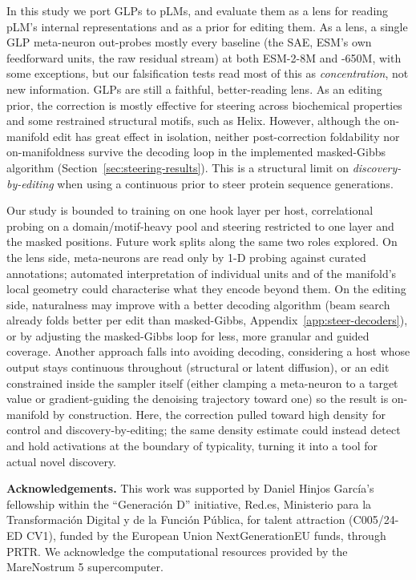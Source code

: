 \documentclass{article}
\begin{document}
In this study we port GLPs to pLMs, and evaluate them as
a lens for reading pLM's internal representations and as a prior for editing them. As a lens, a single
GLP meta-neuron out-probes mostly every baseline (the SAE, ESM's own feedforward units,
the raw residual stream) at both ESM-2-8M and -650M, with some exceptions, but our falsification tests read most of this as \emph{concentration}, not new information. GLPs are still a faithful, better-reading lens. As
an editing prior, the correction is mostly effective for steering across biochemical properties and some restrained structural motifs, such as Helix. However, although the on-manifold edit has great effect in isolation, neither post-correction foldability nor on-manifoldness survive the decoding loop in the implemented masked-Gibbs algorithm (Section~\ref{sec:steering-results}). This is a structural limit on
\emph{discovery-by-editing} when using a continuous prior to steer protein sequence generations.



Our study is bounded to training on one hook layer per host, correlational probing on a domain/motif-heavy
pool and steering restricted to one layer and the masked positions. Future work splits along
the same two roles explored. On the lens side, meta-neurons are read only by 1-D probing against curated annotations; automated
interpretation of individual units and of the manifold's local geometry could
characterise what they encode beyond them. On the editing side, naturalness may improve with a better decoding
algorithm (beam search already folds better per edit than masked-Gibbs,
Appendix~\ref{app:steer-decoders}), or by adjusting the masked-Gibbs loop for less, more granular and guided coverage. Another approach falls into avoiding decoding, considering a host whose output stays continuous throughout (structural or latent
diffusion), or an edit constrained inside the sampler itself (either clamping a meta-neuron to a target
value or gradient-guiding the denoising trajectory toward one) so the result is on-manifold by construction. Here, the correction pulled toward high density for control and discovery-by-editing; the same density estimate could instead detect and hold activations at the boundary of typicality, turning it into a tool for actual novel discovery.


\noindent\textbf{Acknowledgements.} This work was supported by Daniel Hinjos García's fellowship within the ``Generación D'' initiative, Red.es, Ministerio para la Transformación Digital y de la Función Pública, for talent attraction (C005/24-ED CV1), funded by the European Union
 NextGenerationEU funds, through PRTR. We acknowledge the computational resources provided by the MareNostrum 5 supercomputer.
\end{document}
